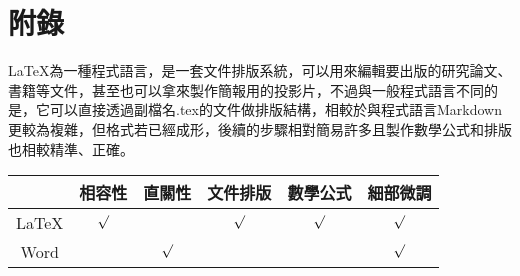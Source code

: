 \chapter*{附錄}
\renewcommand{\baselinestretch}{10} %
\par
\renewcommand{\baselinestretch}{1} %
\twelve
\par LaTeX為一種程式語言，是一套文件排版系統，可以用來編輯要出版的研究論文、書籍等文件，甚至也可以拿來製作簡報用的投影片，不過與一般程式語言不同的是，它可以直接透過副檔名.tex的文件做排版結構，相較於與程式語言Markdown更較為複雜，但格式若已經成形，後續的步驟相對簡易許多且製作數學公式和排版也相較精準、正確。
\\
\par
\renewcommand{\baselinestretch}{1.7} %
\begin{center}
\begin{tabular}[c]{|c|c|c|c|c|c|} %
\hline
		&相容性&直關性&文件排版&數學公式&細部微調
\\
\hline
LaTeX&$\surd$&		&$\surd$&$\surd$&$\surd$
\\
\hline
Word&		&$\surd$&		&		&$\surd$
\\
\hline
\end{tabular}
\end{center}
\par

